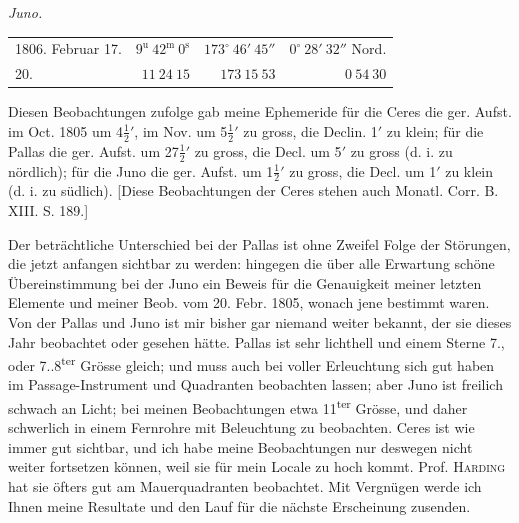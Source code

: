 \begin{center}\emph{Juno.}\end{center}
\begin{center}
\begingroup\fontsize{9}{11}\selectfont\setlength{\tabcolsep}{2pt}\renewcommand{\arraystretch}{1.1}
\begin{tabular}{lr|r|r}
1806. Februar 17. & $9^{\mathrm u}\ 42^{\mathrm m}\ 0^{\mathrm s}$ & $173^\circ\ 46'\ 45''$ & $0^\circ\ 28'\ 32''$ Nord.\\
20. & $11\ 24\ 15$ & $173\ 15\ 53$ & $0\ 54\ 30$\\
\end{tabular}\endgroup
\end{center}

\par\indent Diesen Beobachtungen zufolge gab meine Ephemeride für die Ceres die ger. Aufst. im Oct. 1805 um 4$\frac{1}{2}'$, im Nov. um 5$\frac{1}{2}'$ zu gross, die Declin. 1$'$ zu klein; für die Pallas die ger. Aufst. um 27$\frac{1}{2}'$ zu gross, die Decl. um 5$'$ zu gross (d. i. zu nördlich); für die Juno die ger. Aufst. um 1$\frac{1}{2}'$ zu gross, die Decl. um 1$'$ zu klein (d. i. zu südlich). [Diese Beobachtungen der Ceres stehen auch Monatl. Corr. B. XIII. S. 189.]



\par\indent Der beträchtliche Unterschied bei der Pallas ist ohne Zweifel Folge der Störungen, die jetzt anfangen sichtbar zu werden: hingegen die über alle Erwartung schöne Übereinstimmung bei der Juno ein Beweis für die Genauigkeit meiner letzten Elemente und meiner Beob. vom 20. Febr. 1805, wonach jene bestimmt waren. Von der Pallas und Juno ist mir bisher gar niemand weiter bekannt, der sie dieses Jahr beobachtet oder gesehen hätte. Pallas ist sehr lichthell und einem Sterne 7., oder 7..8\textsuperscript{ter} Grösse gleich; und muss auch bei voller Erleuchtung sich gut haben im Passage-Instrument und Quadranten beobachten lassen; aber Juno ist freilich schwach an Licht; bei meinen Beobachtungen etwa 11\textsuperscript{ter} Grösse, und daher schwerlich in einem Fernrohre mit Beleuchtung zu beobachten. Ceres ist wie immer gut sichtbar, und ich habe meine Beobachtungen nur deswegen nicht weiter fortsetzen können, weil sie für mein Locale zu hoch kommt. Prof. \textsc{Harding} hat sie öfters gut am Mauerquadranten beobachtet. Mit Vergnügen werde ich Ihnen meine Resultate und den Lauf für die nächste Erscheinung zusenden.


